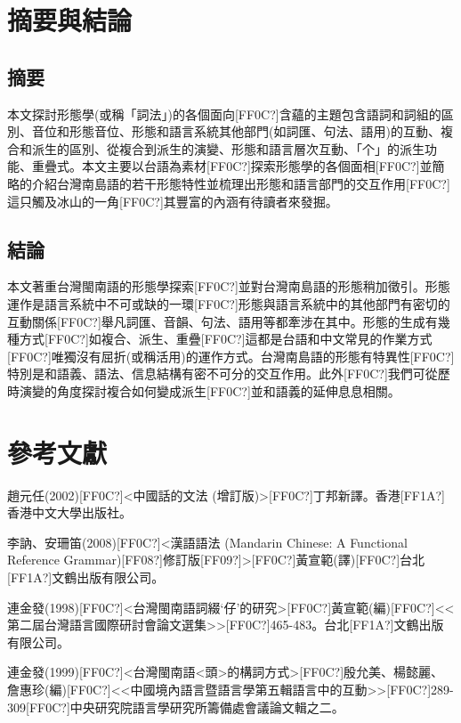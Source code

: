 \section{\rmfamily 摘要與結論}
\subsection{\rmfamily 摘要}

\textrm{本文探討形態學(或稱「詞法」)的各個面向[FF0C?]含蘊的主題包含語詞和詞組的區別、音位和形態音位、形態和語言系統其他部門(如詞匯、句法、語用)的互動、複合和派生的區別、從複合到派生的演變、形態和語言層次互動、「个」的派生功能、重疊式。本文主要以台語為素材[FF0C?]探索形態學的各個面相[FF0C?]並簡略的介紹台灣南島語的若干形態特性並梳理出形態和語言部門的交互作用[FF0C?]這只觸及冰山的一角[FF0C?]其豐富的內涵有待讀者來發掘。}

\subsection{\rmfamily 結論}

\textrm{本文著重台灣閩南語的形態學探索[FF0C?]並對台灣南島語的形態稍加徵引。形態運作是語言系統中不可或缺的一環[FF0C?]形態與語言系統中的其他部門有密切的互動關係[FF0C?]舉凡詞匯、音韻、句法、語用等都牽涉在其中。形態的生成有幾種方式[FF0C?]如複合、派生、重疊[FF0C?]這都是台語和中文常見的作業方式[FF0C?]唯獨沒有屈折(或稱活用)的運作方式。台灣南島語的形態有特異性[FF0C?]特別是和語義、語法、信息結構有密不可分的交互作用。此外[FF0C?]我們可從歷時演變的角度探討複合如何變成派生[FF0C?]並和語義的延伸息息相關。}

\section{\rmfamily 參考文獻}

\textrm{趙元任(2002)[FF0C?]<中國話的文法 (增訂版)>[FF0C?]丁邦新譯。香港[FF1A?]香港中文大學出版社。}

\textrm{李訥、安珊笛(2008)[FF0C?]<漢語語法 (Mandarin Chinese: A Functional Reference Grammar)[FF08?]修訂版[FF09?]>[FF0C?]黃宣範(譯)[FF0C?]台北[FF1A?]文鶴出版有限公司。}

\textrm{連金發(1998)[FF0C?]<台灣閩南語詞綴‘仔’的研究>[FF0C?]黃宣範(編)[FF0C?]<<第二屆台灣語言國際研討會論文選集>}\textrm{>}\textrm{[FF0C?]465-483。台北[FF1A?]文鶴出版有限公司。}

\textrm{連金發(1999)[FF0C?]<台灣閩南語<頭>的構詞方式>[FF0C?]殷允美、楊懿麗、詹惠珍(編)[FF0C?]<<中國境內語言暨語言學{\textbullet}第五輯{\textbullet}語言中的互動>>[FF0C?]289-309[FF0C?]中央研究院語言學研究所籌備處會議論文輯之二。}

